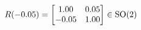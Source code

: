 \documentclass[preview]{standalone}
\begin{document}
\begin{align*}
\special{dvisvgm:raw <g id='unique000'>}R(-0.05) = \begin{bmatrix} 1.00 & 0.05 \\ -0.05 & 1.00 \end{bmatrix} \in \text{SO}(2)\special{dvisvgm:raw </g>}
\end{align*}
\end{document}
